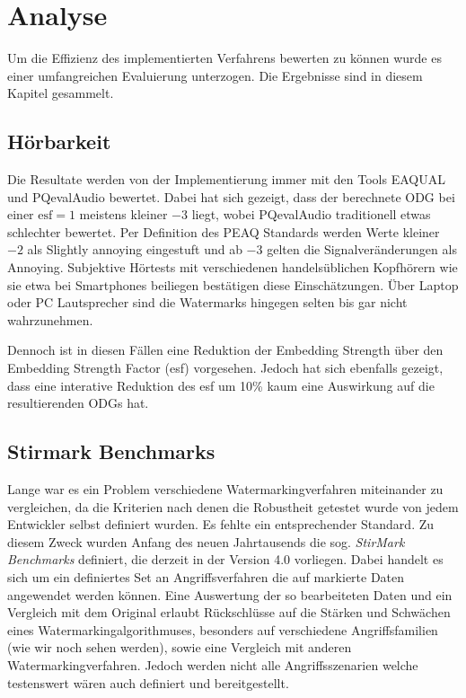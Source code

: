 \chapter{Analyse}
\label{ch:analyse}

Um die Effizienz des implementierten Verfahrens bewerten zu können wurde es einer umfangreichen Evaluierung unterzogen. Die Ergebnisse sind in diesem Kapitel gesammelt. 

\section{Hörbarkeit}

Die Resultate werden von der Implementierung immer mit den Tools EAQUAL und PQevalAudio bewertet. Dabei hat sich gezeigt, dass der berechnete ODG bei einer $\mbox{esf}=1$ meistens kleiner $-3$ liegt, wobei PQevalAudio traditionell etwas schlechter bewertet. Per Definition des PEAQ Standards werden Werte kleiner $-2$ als \glqq{}Slightly annoying\grqq{} eingestuft und ab $-3$ gelten die Signalveränderungen als \glqq{}Annoying\grqq{}. Subjektive Hörtests mit verschiedenen handelsüblichen Kopfhörern wie sie etwa bei Smartphones beiliegen bestätigen diese Einschätzungen. Über Laptop oder PC Lautsprecher sind die Watermarks hingegen selten bis gar nicht wahrzunehmen. 

Dennoch ist in diesen Fällen eine Reduktion der Embedding Strength über den Embedding Strength Factor (esf) vorgesehen. Jedoch hat sich ebenfalls gezeigt, dass eine interative Reduktion des esf um 10\% kaum eine Auswirkung auf die resultierenden ODGs hat.

\section{Stirmark Benchmarks}

Lange war es ein Problem verschiedene Watermarkingverfahren miteinander zu vergleichen, da die Kriterien nach denen die Robustheit getestet wurde von jedem Entwickler selbst definiert wurden. Es fehlte ein entsprechender Standard. Zu diesem Zweck wurden Anfang des neuen Jahrtausends die sog. \textit{StirMark Benchmarks} definiert\cite{petitcolas2000watermarking}\cite{petitcolas2004stirmark}, die derzeit in der Version 4.0 vorliegen. Dabei handelt es sich um ein definiertes Set an Angriffsverfahren die auf markierte Daten angewendet werden können. Eine Auswertung der so bearbeiteten Daten und ein Vergleich mit dem Original erlaubt Rückschlüsse auf die Stärken und Schwächen eines Watermarkingalgorithmuses, besonders auf verschiedene Angriffsfamilien (wie wir noch sehen werden), sowie eine Vergleich mit anderen Watermarkingverfahren. Jedoch werden nicht alle Angriffsszenarien welche testenswert wären auch definiert und bereitgestellt\cite{steinebach2002stirmark}.

